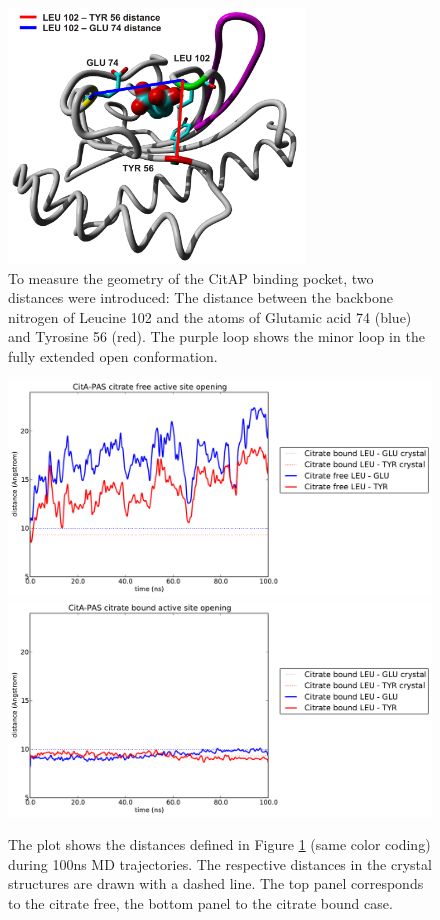 \documentclass[english, a4paper, 12pt, titlepage, draft]{article}
\begin{document}
\begin{figure}
    \centering
    \includegraphics[width=0.7\textwidth]{figures/CitA_pocket2.pdf}
    \caption{To measure the geometry of the CitAP binding pocket, two distances were introduced: The distance between the backbone nitrogen of Leucine 102 and the  atoms of Glutamic acid 74 (blue) and Tyrosine 56 (red).
    The purple loop shows the minor loop in the fully extended open conformation.}
    \label{fig:CitA_pocket}
\end{figure}        

\begin{figure}
    \centering
    \includegraphics[width=1.0\textwidth]{figures/CitA_opening_citrate_free.pdf}
    \includegraphics[width=1.0\textwidth]{figures/CitA_opening_citrate_bound.pdf}
    \caption{The plot shows the distances defined in Figure \ref{fig:CitA_pocket} (same color coding) during 100ns MD trajectories. The respective distances in the crystal structures are drawn with a dashed line. The top panel corresponds to the citrate free, the bottom panel to the citrate bound case.}
    \label{fig:CitA_opening_distances}
\end{figure}       
\end{document}
